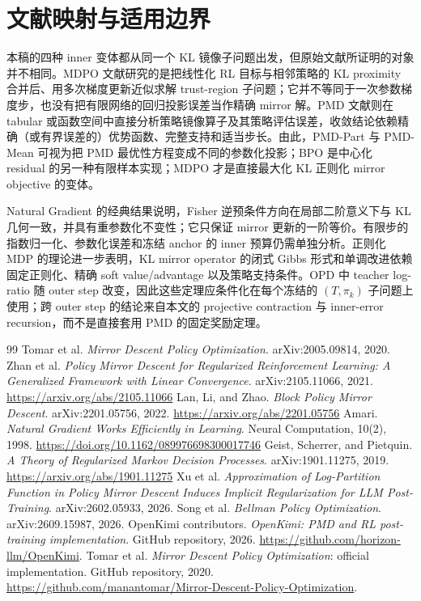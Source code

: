 \backmatter
\chapter{文献映射与适用边界}
\label{ch:literature-map}

本稿的四种 inner 变体都从同一个 KL 镜像子问题出发，但原始文献所证明的对象并不相同。MDPO 文献研究的是把线性化 RL 目标与相邻策略的 KL proximity 合并后、用多次梯度更新近似求解 trust-region 子问题；它并不等同于一次参数梯度步，也没有把有限网络的回归投影误差当作精确 mirror 解。PMD 文献则在 tabular 或函数空间中直接分析策略镜像算子及其策略评估误差，收敛结论依赖精确（或有界误差的）优势函数、完整支持和适当步长。由此，PMD-Part 与 PMD-Mean 可视为把 PMD 最优性方程变成不同的参数化投影；BPO 是中心化 residual 的另一种有限样本实现；MDPO 才是直接最大化 KL 正则化 mirror objective 的变体。\cite{tomar2020mdpo,zhan2021pmd,lan2022blockpmd}

Natural Gradient 的经典结果说明，Fisher 逆预条件方向在局部二阶意义下与 KL 几何一致，并具有重参数化不变性；它只保证 mirror 更新的一阶等价。有限步的指数归一化、参数化误差和冻结 anchor 的 inner 预算仍需单独分析。正则化 MDP 的理论进一步表明，KL mirror operator 的闭式 Gibbs 形式和单调改进依赖固定正则化、精确 soft value/advantage 以及策略支持条件。OPD 中 teacher log-ratio 随 outer step 改变，因此这些定理应条件化在每个冻结的 $(T,\pi_k)$ 子问题上使用；跨 outer step 的结论来自本文的 projective contraction 与 inner-error recursion，而不是直接套用 PMD 的固定奖励定理。\cite{amari1998natural,geist2019regularizedmdp}

\begin{thebibliography}{99}
Tomar et al. \emph{Mirror Descent Policy Optimization}. arXiv:2005.09814, 2020.
Zhan et al. \emph{Policy Mirror Descent for Regularized Reinforcement Learning: A Generalized Framework with Linear Convergence}. arXiv:2105.11066, 2021. \url{https://arxiv.org/abs/2105.11066}
Lan, Li, and Zhao. \emph{Block Policy Mirror Descent}. arXiv:2201.05756, 2022. \url{https://arxiv.org/abs/2201.05756}
Amari. \emph{Natural Gradient Works Efficiently in Learning}. Neural Computation, 10(2), 1998. \url{https://doi.org/10.1162/089976698300017746}
Geist, Scherrer, and Pietquin. \emph{A Theory of Regularized Markov Decision Processes}. arXiv:1901.11275, 2019. \url{https://arxiv.org/abs/1901.11275}
Xu et al. \emph{Approximation of Log-Partition Function in Policy Mirror Descent Induces Implicit Regularization for LLM Post-Training}. arXiv:2602.05933, 2026.
Song et al. \emph{Bellman Policy Optimization}. arXiv:2609.15987, 2026.
OpenKimi contributors. \emph{OpenKimi: PMD and RL post-training implementation}. GitHub repository, 2026. \url{https://github.com/horizon-llm/OpenKimi}.
Tomar et al. \emph{Mirror Descent Policy Optimization}: official implementation. GitHub repository, 2020. \url{https://github.com/manantomar/Mirror-Descent-Policy-Optimization}.
\end{thebibliography}

